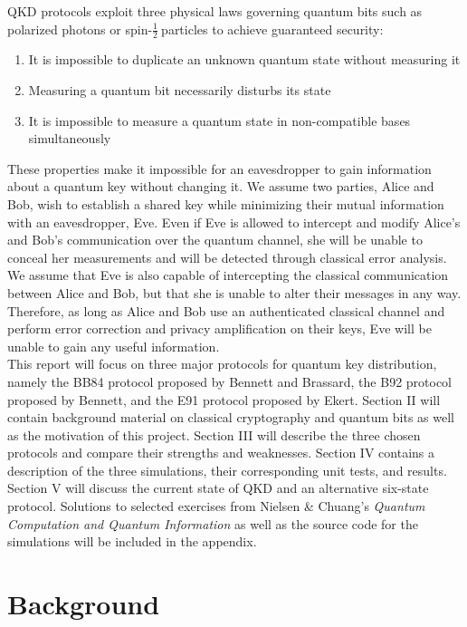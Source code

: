 \documentclass[conference]{IEEEtran}
\begin{document}
QKD protocols exploit three physical laws governing quantum bits such as polarized photons or spin-\( \frac{1}{2}\ \)particles to achieve guaranteed security:
\begin{enumerate}
\item It is impossible to duplicate an unknown quantum state without measuring it
\item Measuring a quantum bit necessarily disturbs its state
\item It is impossible to measure a quantum state in non-compatible bases simultaneously
\end{enumerate}
These properties make it impossible for an eavesdropper to gain information about a quantum key without changing it. We assume two parties, Alice and Bob, wish to establish a shared key while minimizing their mutual information with an eavesdropper, Eve. Even if Eve is allowed to intercept and modify Alice's and Bob's communication over the quantum channel, she will be unable to conceal her measurements and will be detected through classical error analysis. We assume that Eve is also capable of intercepting the classical communication between Alice and Bob, but that she is unable to alter their messages in any way. Therefore, as long as Alice and Bob use an authenticated classical channel and perform error correction and privacy amplification on their keys, Eve will be unable to gain any useful information.\\

This report will focus on three major protocols for quantum key distribution, namely the BB84 protocol proposed by Bennett and Brassard\cite{BB84}, the B92 protocol proposed by Bennett\cite{B92}, and the E91 protocol proposed by Ekert\cite{E91}. Section II will contain background material on classical cryptography and quantum bits as well as the motivation of this project. Section III will describe the three chosen protocols and compare their strengths and weaknesses. Section IV contains a description of the three simulations, their corresponding unit tests, and results. Section V will discuss the current state of QKD and an alternative six-state protocol. Solutions to selected exercises from Nielsen \& Chuang's \textit{Quantum Computation and Quantum Information} as well as the source code for the simulations will be included in the appendix.\\

\section{Background}
\end{document}
